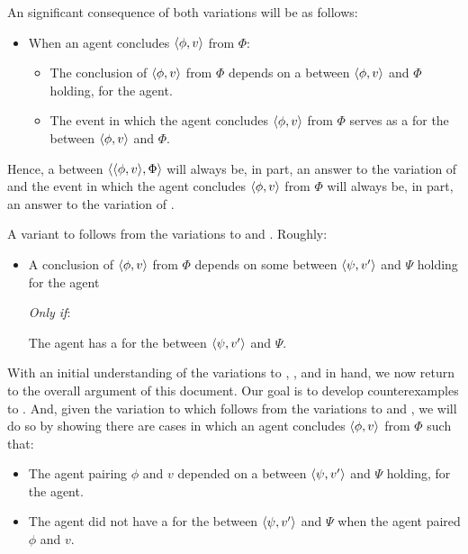 \begin{note}
  An significant consequence of both variations will be as follows:

  \begin{itemize}
  \item
    When an agent concludes \(\langle \phi, v \rangle\) from \(\Phi\):
    \begin{itemize}
    \item The \agents{} conclusion of \(\langle \phi, v \rangle\) from \(\Phi\) depends on a  between \(\langle \phi, v \rangle\) and \(\Phi\) holding, for the agent.
    \item The event in which the agent concludes \(\langle \phi, v \rangle\) from \(\Phi\) serves as a  for the  between \(\langle \phi, v \rangle\) and \(\Phi\).
    \end{itemize}
  \end{itemize}
  Hence, a \ros{} between \(\langle \langle \phi, v \rangle, \Phi \rangle\) will always be, in part, an answer to the variation of \qWhy{} and the event in which the agent concludes \(\langle \phi, v \rangle\) from \(\Phi\) will always be, in part, an answer to the variation of \qHow{}.
\end{note}

\begin{note}
  A variant to \issueInclusion{} follows from the variations to \qWhy{} and \qHow{}.
  Roughly:

  \begin{itemize}
  \item
    A conclusion of \(\langle \phi, v \rangle\) from \(\Phi\) depends on some \ros{} between \(\langle \psi, v' \rangle\) and \(\Psi\) holding for the agent

    \emph{Only if}:

    The agent has a \wit{} for the  between \(\langle \psi, v' \rangle\) and \(\Psi\).
  \end{itemize}
\end{note}

\begin{note}
  With an initial understanding of the variations to \qWhy{}, \qHow{}, and \issueInclusion{} in hand, we now return to the overall argument of this document.
  Our goal is to develop counterexamples to \issueInclusion{}.
  And, given the variation to \issueInclusion{} which follows from the variations to \qWhy{} and \qHow{}, we will do so by showing there are cases in which an agent concludes \(\langle \phi, v \rangle\) from \(\Phi\) such that:
  \begin{itemize}
  \item
    The agent pairing \(\phi\) and \(v\) depended on a  between \(\langle \psi, v' \rangle\) and \(\Psi\) holding, for the agent.
  \item
    The agent did not have a  for the  between \(\langle \psi, v' \rangle\) and \(\Psi\) when the agent paired \(\phi\) and \(v\).
  \end{itemize}
\end{note}

